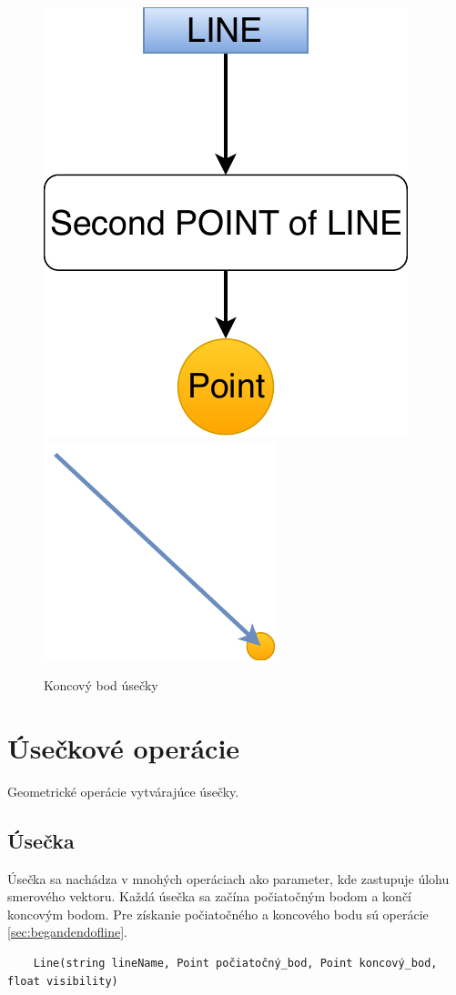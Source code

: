 \begin{figure}[H]
	\centering
	\includegraphics[height=0.3\textwidth]{obrazky-figures/Diagram/Point/DP Navrh operacii-0D - PointSecond POINT of LINE.pdf}
	\includegraphics[height=0.3\textwidth]{obrazky-figures/Diagram/Draw/1Points/DP Navrh operacii-0D - PointSecondPointOfLine.pdf}
	\caption{Koncový bod úsečky}
	\label{fig:1}
\end{figure}



	






\section{Úsečkové operácie}
Geometrické operácie vytvárajúce úsečky. 

\subsection{Úsečka}
Úsečka sa nachádza v mnohých operáciach ako parameter, kde zastupuje úlohu smerového vektoru. Každá úsečka sa začína počiatočným bodom a končí koncovým bodom. Pre získanie počiatočného a koncového bodu sú operácie \ref{sec:begandendofline}.

\begin{lstlisting}
	Line(string lineName, Point počiatočný_bod, Point koncový_bod, float visibility)
\end{lstlisting}

